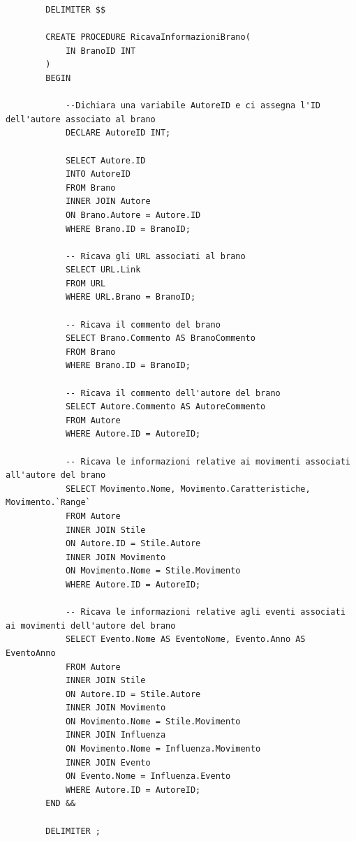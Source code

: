 \documentclass{article}
\begin{document}
    \begin{verbatim}
        DELIMITER $$

        CREATE PROCEDURE RicavaInformazioniBrano(
            IN BranoID INT
        )
        BEGIN

            --Dichiara una variabile AutoreID e ci assegna l'ID dell'autore associato al brano
            DECLARE AutoreID INT;

            SELECT Autore.ID
            INTO AutoreID
            FROM Brano
            INNER JOIN Autore
            ON Brano.Autore = Autore.ID
            WHERE Brano.ID = BranoID;

            -- Ricava gli URL associati al brano
            SELECT URL.Link
            FROM URL
            WHERE URL.Brano = BranoID;

            -- Ricava il commento del brano
            SELECT Brano.Commento AS BranoCommento
            FROM Brano
            WHERE Brano.ID = BranoID;

            -- Ricava il commento dell'autore del brano
            SELECT Autore.Commento AS AutoreCommento
            FROM Autore
            WHERE Autore.ID = AutoreID;

            -- Ricava le informazioni relative ai movimenti associati all'autore del brano
            SELECT Movimento.Nome, Movimento.Caratteristiche, Movimento.`Range`
            FROM Autore
            INNER JOIN Stile
            ON Autore.ID = Stile.Autore
            INNER JOIN Movimento
            ON Movimento.Nome = Stile.Movimento
            WHERE Autore.ID = AutoreID;

            -- Ricava le informazioni relative agli eventi associati ai movimenti dell'autore del brano
            SELECT Evento.Nome AS EventoNome, Evento.Anno AS EventoAnno
            FROM Autore
            INNER JOIN Stile
            ON Autore.ID = Stile.Autore
            INNER JOIN Movimento
            ON Movimento.Nome = Stile.Movimento
            INNER JOIN Influenza
            ON Movimento.Nome = Influenza.Movimento
            INNER JOIN Evento
            ON Evento.Nome = Influenza.Evento
            WHERE Autore.ID = AutoreID;
        END &&

        DELIMITER ;
    \end{verbatim}
\end{document}
